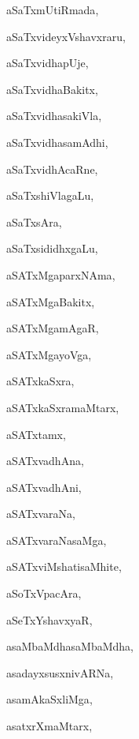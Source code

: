 \begin{multicols}{3}
{\noindent
{aSaTxmUtiRmada}, \pageref{aSaTxmUtiRmada}

\noindent
{aSaTxvideyxVshavxraru}, \pageref{aSaTxvideyxVshavxraru}

\noindent
{aSaTxvidhapUje}, \pageref{aSaTxvidhapUje}

\noindent
{aSaTxvidhaBakitx}, \pageref{aSaTxvidhaBakitx}

\noindent
{aSaTxvidhasakiVla}, \pageref{aSaTxvidhasakiVla}

\noindent
{aSaTxvidhasamAdhi}, \pageref{aSaTxvidhasamAdhi}

\noindent
{aSaTxvidhAcaRne}, \pageref{aSaTxvidhAcaRne}

\noindent
{aSaTxshiVlagaLu}, \pageref{aSaTxshiVlagaLu}

\noindent
{aSaTxsAra}, \pageref{aSaTxsAra}

\noindent
{aSaTxsididhxgaLu}, \pageref{aSaTxsididhxgaLu}

\noindent
{aSATxMgaparxNAma}, \pageref{aSATxMgaparxNAma}

\noindent
{aSATxMgaBakitx}, \pageref{aSATxMgaBakitx}

\noindent
{aSATxMgamAgaR}, \pageref{aSATxMgamAgaR}

\noindent
{aSATxMgayoVga}, \pageref{aSATxMgayoVga}

\noindent
{aSATxkaSxra}, \pageref{aSATxkaSxra}

\noindent
{aSATxkaSxramaMtarx}, \pageref{aSATxkaSxramaMtarx}

\noindent
{aSATxtamx}, \pageref{aSATxtamx}

\noindent
{aSATxvadhAna}, \pageref{aSATxvadhAna}

\noindent
{aSATxvadhAni}, \pageref{aSATxvadhAni}

\noindent
{aSATxvaraNa}, \pageref{aSATxvaraNa}

\noindent
{aSATxvaraNasaMga}, \pageref{aSATxvaraNasaMga}

\noindent
{aSATxviMshatisaMhite}, \pageref{aSATxviMshatisaMhite}

\noindent
{aSoTxVpacAra}, \pageref{aSoTxVpacAra}

\noindent
{aSeTxYshavxyaR}, \pageref{aSeTxYshavxyaR}

\noindent
{asaMbaMdhasaMbaMdha}, \pageref{asaMbaMdhasaMbaMdha}

\noindent
{asadayxsusxnivARNa}, \pageref{asadayxsusxnivARNa}

\noindent
{asamAkaSxliMga}, \pageref{asamAkaSxliMga}

\noindent
{asatxrXmaMtarx}, \pageref{asatxrXmaMtarx}

}
\end{multicols}
